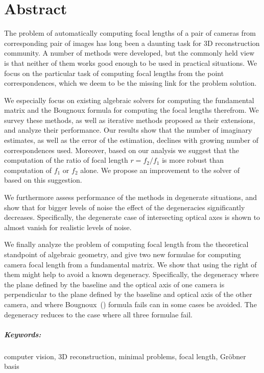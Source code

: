 

\chapter*{Abstract}
The problem of automatically computing focal lengths of a pair of cameras from corresponding pair of images has long been a daunting task for 3D reconstruction  community. A number of methods were developed, but the commonly held view is that neither of them works good enough to be used in practical situations. We focus on the particular task of computing focal lengths from the point correspondences, which we deem to be the missing link for the problem solution.

We especially focus on existing algebraic solvers for computing the fundamental matrix and the Bougnoux formula for computing the focal lengths therefrom. We  survey these methods, as well as iterative methods \cite{HartleyPriors,Chandraker} proposed as their extensions,  and analyze their performance. Our results show that the number of imaginary estimates, as well as the error of the estimation, declines with growing number of correspondences used.  Moreover, based on our analysis we suggest that the computation of the ratio of focal length $r= f_2 \slash f_1$ is more robust than
computation of $f_1$ or $f_2$ alone. We propose an improvement to the solver of~\cite{HartleyPriors} based on this suggestion.

We furthermore assess performance of the methods in  degenerate situations, and show that for bigger levels of noise the effect of the degeneracies significantly decreases. Specifically, the degenerate case of intersecting optical axes is shown to almost vanish for realistic levels of noise.

We finally analyze the problem of computing focal length from the theoretical standpoint of algebraic geometry, and give two new formulae for computing camera focal length from a fundamental matrix. We show that using the right of them might help to avoid a known degeneracy. Specifically, the degeneracy where the plane defined by the baseline and the optical axis of one camera is perpendicular to the plane defined by the baseline and optical axis of the other camera, and where Bougnoux~(\cite{Bougnoux}) formula fails can in some cases be avoided. The degeneracy reduces to the case where all three formulae fail.

\paragraph{Keywords:} computer vision, 3D reconstruction, minimal problems, focal length, Gr\"ob\-ner basis

